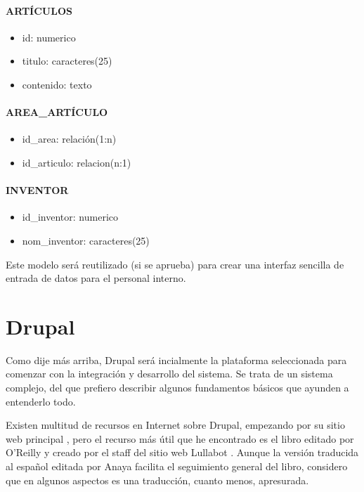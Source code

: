 \paragraph{ARTÍCULOS}
\begin{itemize}
\item id: numerico
\item titulo: caracteres(25)
\item contenido: texto
\end{itemize}

\paragraph{AREA\_ARTÍCULO}
\begin{itemize}
\item id\_area: relación(1:n)
\item id\_articulo: relacion(n:1)
\end{itemize}

\paragraph{INVENTOR}
\begin{itemize}
\item id\_inventor: numerico
\item nom\_inventor: caracteres(25)
\end{itemize}

\par Este modelo será reutilizado (si se aprueba) para crear una interfaz sencilla de entrada de datos para el personal interno.

\section{Drupal}

\par Como dije más arriba, Drupal será incialmente la plataforma seleccionada para comenzar con la integración y desarrollo del sistema. Se trata de un sistema complejo, del que prefiero describir algunos fundamentos básicos que ayunden a entenderlo todo.

\par Existen multitud de recursos en Internet sobre Drupal, empezando por su sitio web principal \cite{references:drupalhome}, pero el recurso más útil que he encontrado es el libro editado por O'Reilly \cite{ByronBerryHaugEatonWalkerRobbins200812} y creado por el staff del sitio web Lullabot \cite{references:lullabot}. Aunque la versión traducida al español editada por Anaya \cite{ByronBerryHaugEatonWalkerRobbins200909} facilita el seguimiento general del libro, considero que en algunos aspectos es una traducción, cuanto menos, apresurada.

